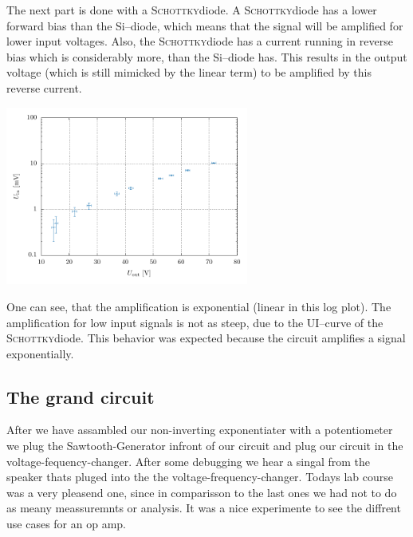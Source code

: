\documentclass[a4paper,10pt]{article}
\newenvironment{Figure}
        {\par\medskip\noindent\minipage{\linewidth}}
        {\endminipage\par\medskip} %
\numberwithin{equation}{section}
\begin{document}
\begin{multicols}{2}
\begin{Figure}
        \end{Figure}
        \noindent The next part is done with a \textsc{Schottky}diode.
        A \textsc{Schottky}diode has a lower forward bias than the Si--diode, which means that the signal will be amplified for lower input voltages.
        Also, the \textsc{Schottky}diode has a current running in reverse bias which is considerably more, than the Si--diode has.
        This results in the output voltage (which is still mimicked by the linear term) to be amplified by this reverse current.
        \begin{Figure}
                \centering
                \includegraphics[width=0.6\textwidth]{../plot/6_1_2_crop.pdf}
        \end{Figure}
        \noindent One can see, that the amplification is exponential (linear in this log plot).
        The amplification for low input signals is not as steep, due to the UI--curve of the \textsc{Schottky}diode.
        This behavior was expected because the circuit amplifies a signal exponentially.


  \subsection{The grand circuit}
  After we have assambled our non-inverting exponentiater with a potentiometer we plug the Sawtooth-Generator infront of our circuit and plug our circuit in the voltage-fequency-changer. After some debugging we hear a singal from the speaker thats pluged into the the voltage-frequency-changer. Todays lab course was a very pleasend one, since in comparisson to the last ones we had not to do as meany meassuremnts or analysis. It was a nice experimente to see the diffrent use cases for an op amp.

\end{multicols}
\end{document}
